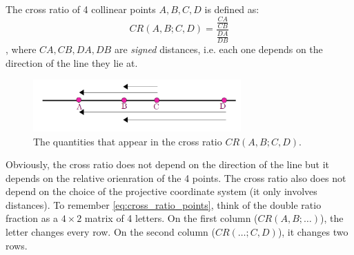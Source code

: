 \documentclass[a4paper]{article}
\begin{document}
\begin{definition}
The cross ratio of 4 collinear points $A,B,C,D$ is defined as:
\begin{equation}
    CR(A,B;C,D) = \frac{\frac{CA}{CB}}{\frac{DA}{DB}}
    \label{eq:cross_ratio_points}
\end{equation}
, where $CA, CB, DA, DB$ are \textit{signed} distances, i.e. each one depends on the direction of the line they lie at.
\end{definition}
\begin{figure}[H]
    \centering
    \includegraphics[height=2cm]{img/cross_ratio_4_points.png}
    \caption{The quantities that appear in the cross ratio $CR(A,B;C,D)$.}
\end{figure}
Obviously, the cross ratio does not depend on the direction of the line but it depends on the relative orienration of the 4 points. The cross ratio also does not depend on the choice of the projective coordinate system (it only involves distances). To remember \eqref{eq:cross_ratio_points}, think of the double ratio fraction as a $4\times 2$ matrix of 4 letters. On the first column ($CR(A,B;\ldots)$), the letter changes every row. On the second column ($CR(\ldots;C,D)$), it changes two rows.
\end{document}
